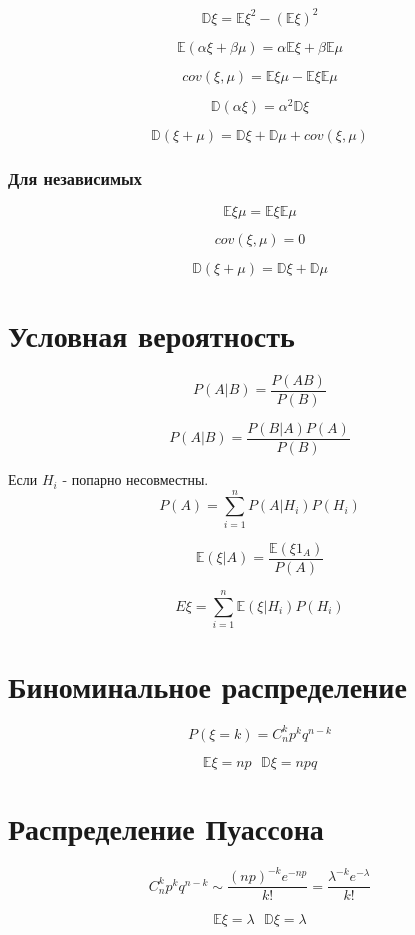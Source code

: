 \documentclass[a4paper, 14pt]{extarticle}
\begin{document}
$$\mathbb{D}\xi = \mathbb{E}\xi^2 - (\mathbb{E}\xi)^2$$

$$\mathbb{E}(\alpha \xi + \beta \mu) = \alpha \mathbb{E}\xi + \beta \mathbb{E}\mu$$

$$cov(\xi, \mu) = \mathbb{E}\xi\mu - \mathbb{E}\xi\mathbb{E}\mu$$

$$\mathbb{D}(\alpha\xi) = \alpha^2 \mathbb{D}\xi $$

$$\mathbb{D}(\xi + \mu) = \mathbb{D}\xi + \mathbb{D}\mu + cov(\xi, \mu)$$

\subsubsection{Для независимых}

$$\mathbb{E}\xi\mu = \mathbb{E}\xi\mathbb{E}\mu$$

$$cov(\xi, \mu) = 0$$

$$\mathbb{D}(\xi + \mu) = \mathbb{D}\xi + \mathbb{D}\mu$$



\section{Условная вероятность}

$$P(A|B) = \frac{P(AB)}{P(B)}$$

$$P(A|B) = \frac{P(B|A)P(A)}{P(B)}$$

Если $H_i$ - попарно несовместны.
$$P(A) = \sum_{i=1}^{n}P(A|H_i)P(H_i)$$

$$\mathbb{E}(\xi|A) = \frac{\mathbb{E}(\xi1_{A})}{P(A)}$$

$$E\xi = \sum_{i=1}^{n}\mathbb{E}(\xi|H_i)P(H_i)$$

\section{Биноминальное распределение}

$$P(\xi = k) = C_n^kp^kq^{n-k}$$

$$\mathbb{E}\xi = np~~~\mathbb{D}\xi = npq$$


\section{Распределение Пуассона}

$$C_n^kp^kq^{n-k} \sim \frac{(np)^{-k}e^{-np}}{k!} = \frac{\lambda^{-k}e^{-\lambda}}{k!}$$

$$\mathbb{E}\xi = \lambda~~~\mathbb{D}\xi = \lambda$$
\end{document}

